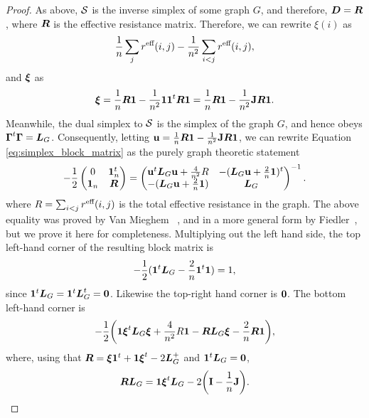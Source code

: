 \begin{proof}
As above, $\mathcal{S}$ is the inverse simplex of some graph $G$, and therefore, $\vb*{D}=\vb*{R}$, where $\vb*{R}$ is the effective resistance matrix. Therefore, we can rewrite $\xi(i)$ as 
\begin{align*}
\frac{1}{n}\sum_j r^{\text{eff}}(i,j) - \frac{1}{n^2}\sum_{i<j}r^{\text{eff}}(i,j),
\end{align*}
and $\vb*{\xi}$ as 
\begin{align*}
\vb*{\xi} = \frac{1}{n}\vb*{R}\vb{1} - \frac{1}{n^2} \vb{1} \vb{1}^t \vb*{R}\vb{1} = \frac{1}{n}\vb*{R}\vb{1} - \frac{1}{n^2} \vb{J} \vb*{R}\vb{1}.
\end{align*}
Meanwhile, the dual simplex to $\mathcal{S}$ is the simplex of the graph $G$, and hence obeys $\vb*{\Gamma}^t\vb*{\Gamma}=\vb*{L}_G$. Consequently, letting $\vb{u}=\frac{1}{n}\vb*{R}\vb{1} - \frac{1}{n^2} \vb{J} \vb*{R}\vb{1}$, we can rewrite Equation \ref{eq:simplex_block_matrix} as the purely graph theoretic statement  
\begin{equation*}
	-\frac{1}{2} \begin{pmatrix}
0 & \vb{1}_n^t \\ 
\vb{1}_n &  \vb*{R}
\end{pmatrix} = 
\begin{pmatrix}
\vb{u}^t \vb*{L}_G\vb{u} + \frac{4}{n^2}R & -(\vb*{L}_G\vb{u} + \frac{2}{n}\vb{1})^t \\
-(\vb*{L}_G\vb{u} + \frac{2}{n}\vb{1}) & \vb*{L}_G
\end{pmatrix}^{-1}.
\end{equation*}
where $R=\sum_{i<j}r^{\text{eff}}(i,j)$ is the total effective resistance in the graph. The above equality was proved by Van Mieghem \etal~\cite{van2017pseudoinverse}, and in a more general form by Fiedler~\cite{fiedler1993geometric,fiedler2011matrices}, but we prove it here for completeness. Multiplying out the left hand side, the top left-hand corner of the resulting block matrix is
\[-\frac{1}{2}(\vb{1}^t\vb*{L}_G - \frac{2}{n}\vb{1}^t \vb{1}) = 1,\]
since $\vb{1}^t \vb*{L}_G=\vb{1}^t\vb*{L}_G^t =\vb{0}$. Likewise the top-right hand corner is $\vb{0}$. The bottom left-hand corner is 
\begin{equation}
\label{eq:lem_block_matrix}
-\frac{1}{2}\bigg(\vb{1}\vb*{\xi}^t \vb*{L}_G\vb*{\xi} +\frac{4}{n^2} R \vb{1} - \vb*{R}\vb*{L}_G\vb*{\xi} - \frac{2}{n}\vb*{R}\vb{1}\bigg),
\end{equation}
where, using that $\vb*{R}=\vb*{\xi} \vb{1}^t + \vb{1} \vb*{\xi}^t -2\vb*{L}_G^+$ and $\vb{1}^t\vb*{L}_G=\vb{0}$, 
\begin{align}
\vb*{R}\vb*{L}_G = \vb{1}\vb*{\xi}^t \vb*{L}_G - 2\bigg(\vb{I}-\frac{1}{n}\vb{J}\bigg).\label{eq:lem_block_matrix2}
\end{align}

\end{proof}
